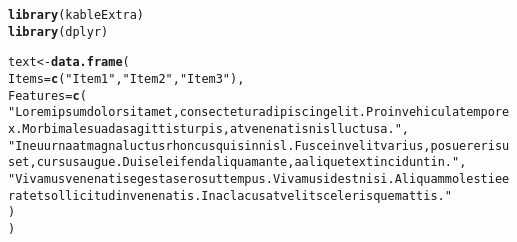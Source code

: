 \documentclass[a4paper]{article}\usepackage[]{graphicx}\usepackage[]{color}
\makeatletter
\newcommand{\hlstr}[1]{\textcolor[rgb]{0.192,0.494,0.8}{#1}}%
\newcommand{\hlstd}[1]{\textcolor[rgb]{0.345,0.345,0.345}{#1}}%
\newcommand{\hlkwb}[1]{\textcolor[rgb]{0.69,0.353,0.396}{#1}}%
\newcommand{\hlkwc}[1]{\textcolor[rgb]{0.333,0.667,0.333}{#1}}%
\newcommand{\hlkwd}[1]{\textcolor[rgb]{0.737,0.353,0.396}{\textbf{#1}}}%
\newenvironment{kframe}{%
 \def\at@end@of@kframe{}%
 \ifinner\ifhmode%
  \def\at@end@of@kframe{\end{minipage}}%
  \begin{minipage}{\columnwidth}%
 \fi\fi%
 \def\FrameCommand##1{\hskip\@totalleftmargin \hskip-\fboxsep
 \colorbox{shadecolor}{##1}\hskip-\fboxsep
     \hskip-\linewidth \hskip-\@totalleftmargin \hskip\columnwidth}%
 \MakeFramed {\advance\hsize-\width
   \@totalleftmargin\z@ \linewidth\hsize
   \@setminipage}}%
 {\par\unskip\endMakeFramed%
 \at@end@of@kframe}
\newenvironment{knitrout}{}{} %
\makeatother
\begin{document}
\begin{knitrout}
\color{fgcolor}\begin{kframe}
\begin{alltt}
\hlkwd{library}\hlstd{(kableExtra)}
\hlkwd{library}\hlstd{(dplyr)}
\end{alltt}


{\ttfamily\noindent\itshape\color{messagecolor}{\#\# \\\#\# Attaching package: 'dplyr'}}

{\ttfamily\noindent\itshape\color{messagecolor}{\#\# The following object is masked from 'package:kableExtra':\\\#\# \\\#\#\ \ \ \  group\_rows}}

{\ttfamily\noindent\itshape\color{messagecolor}{\#\# The following objects are masked from 'package:stats':\\\#\# \\\#\#\ \ \ \  filter, lag}}

{\ttfamily\noindent\itshape\color{messagecolor}{\#\# The following objects are masked from 'package:base':\\\#\# \\\#\#\ \ \ \  intersect, setdiff, setequal, union}}\begin{alltt}
\hlstd{text} \hlkwb{<-} \hlkwd{data.frame}\hlstd{(}
\hlkwc{Items} \hlstd{=} \hlkwd{c}\hlstd{(}\hlstr{"Item 1"}\hlstd{,} \hlstr{"Item 2"}\hlstd{,} \hlstr{"Item 3"}\hlstd{),}
\hlkwc{Features} \hlstd{=} \hlkwd{c}\hlstd{(}
\hlstr{"Lorem ipsum dolor sit amet, consectetur adipiscing elit. Proin vehicula tempor ex. Morbi malesuada sagittis turpis, at venenatis nisl luctus a. "}\hlstd{,}
\hlstr{"In eu urna at magna luctus rhoncus quis in nisl. Fusce in velit varius, posuere risus et, cursus augue. Duis eleifend aliquam ante, a aliquet ex tincidunt in. "}\hlstd{,}
\hlstr{"Vivamus venenatis egestas eros ut tempus. Vivamus id est nisi. Aliquam molestie erat et sollicitudin venenatis. In ac lacus at velit scelerisque mattis. "}
\hlstd{)}
\hlstd{)}


\end{alltt}
\end{kframe}
\end{knitrout}
\end{document}
